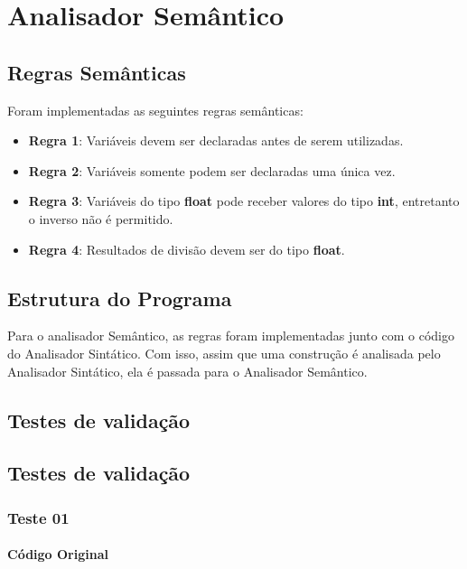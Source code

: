 \chapter{Analisador Semântico}
\label{cap:semantico}

\section{Regras Semânticas}
\label{sec:semanticoRegras}
Foram implementadas as seguintes regras semânticas:

\begin{itemize}
\item \textbf{Regra 1}: Variáveis devem ser declaradas antes de serem utilizadas.
\item \textbf{Regra 2}: Variáveis somente podem ser declaradas uma única vez.
\item \textbf{Regra 3}: Variáveis do tipo \textbf{float} pode receber valores do tipo \textbf{int}, entretanto o inverso não é permitido.
\item \textbf{Regra 4}: Resultados de divisão devem ser do tipo \textbf{float}.

\end{itemize}

\section{Estrutura do Programa}
\label{sec:semanticoEstrutura}
Para o analisador Semântico, as regras foram implementadas junto com o código do Analisador Sintático.
Com isso, assim que uma construção é analisada pelo Analisador Sintático, ela é passada para o Analisador Semântico.

\section{Testes de validação}

\section{Testes de validação}
\label{sec:semanticoTestes}

\subsection{Teste 01}
\label{subsec:semanticoTeste01}

\subsubsection{Código Original}


